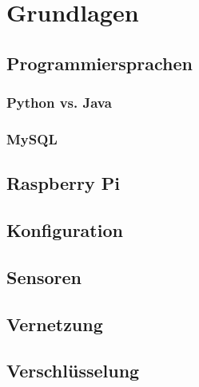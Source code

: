 \chapter{Grundlagen}

\section{Programmiersprachen}

\subsection{Python vs. Java}

\subsection{MySQL}

\section{Raspberry Pi}

\section{Konfiguration}

\section{Sensoren}

\section{Vernetzung}

\section{Verschlüsselung}